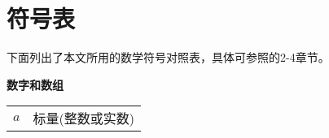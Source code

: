 \chapter*{符号表}
\label{notation}



下面列出了本文所用的数学符号对照表，具体可参照\citet{dlbook}的2-4章节。

\vspace{\notationgap}
\begin{minipage}{\textwidth}
\centerline{\bf 数字和数组}
\bgroup
\def\arraystretch{1.5}
\begin{tabular}{cp{3.25in}} 
$\displaystyle a$ & 标量(整数或实数)\\

\end{tabular}
\end{minipage}
